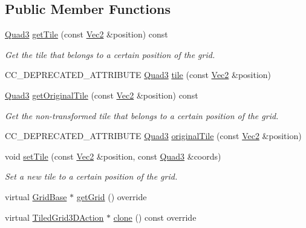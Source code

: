 \subsection*{Public Member Functions}
\begin{DoxyCompactItemize}
\item 
\hyperlink{structQuad3}{Quad3} \hyperlink{classTiledGrid3DAction_a302f322743e028d4b4002af22490e117}{get\+Tile} (const \hyperlink{classVec2}{Vec2} \&position) const
\begin{DoxyCompactList}\small\item\em Get the tile that belongs to a certain position of the grid. \end{DoxyCompactList}\item 
C\+C\+\_\+\+D\+E\+P\+R\+E\+C\+A\+T\+E\+D\+\_\+\+A\+T\+T\+R\+I\+B\+U\+TE \hyperlink{structQuad3}{Quad3} \hyperlink{classTiledGrid3DAction_a0ba5c4fa07a2cc34fbdbf78af6e3c655}{tile} (const \hyperlink{classVec2}{Vec2} \&position)
\item 
\hyperlink{structQuad3}{Quad3} \hyperlink{classTiledGrid3DAction_a4529b2fa5b1aafecad8537985c2d7d1b}{get\+Original\+Tile} (const \hyperlink{classVec2}{Vec2} \&position) const
\begin{DoxyCompactList}\small\item\em Get the non-\/transformed tile that belongs to a certain position of the grid. \end{DoxyCompactList}\item 
C\+C\+\_\+\+D\+E\+P\+R\+E\+C\+A\+T\+E\+D\+\_\+\+A\+T\+T\+R\+I\+B\+U\+TE \hyperlink{structQuad3}{Quad3} \hyperlink{classTiledGrid3DAction_a6f627438c608ce230cbf60d7efddcfd6}{original\+Tile} (const \hyperlink{classVec2}{Vec2} \&position)
\item 
void \hyperlink{classTiledGrid3DAction_aa916f780d3f7837a9bd3d012ce1be936}{set\+Tile} (const \hyperlink{classVec2}{Vec2} \&position, const \hyperlink{structQuad3}{Quad3} \&coords)
\begin{DoxyCompactList}\small\item\em Set a new tile to a certain position of the grid. \end{DoxyCompactList}\item 
virtual \hyperlink{classGridBase}{Grid\+Base} $\ast$ \hyperlink{classTiledGrid3DAction_a6481f8c3be55a8edc01527a7d62e9fce}{get\+Grid} () override
\item 
virtual \hyperlink{classTiledGrid3DAction}{Tiled\+Grid3\+D\+Action} $\ast$ \hyperlink{classTiledGrid3DAction_a689fd377cc0abae91db7def106529b53}{clone} () const override

\end{DoxyCompactItemize}
